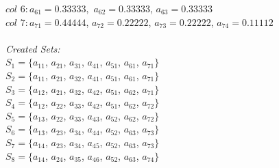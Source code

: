 \documentclass{article}
\begin{document}
$col$ $6 : a_{61} = 0.33333,$ $a_{62} = 0.33333$, $a_{63} = 0.33333$\\
$col$ $7 : a_{71} = 0.44444$, $a_{72} = 0.22222$, $a_{73} = 0.22222$, $a_{74} = 0.11112$\\
\\\textit{Created Sets:}\\
$S_1 = \{a_{11}$, $a_{21}$, $a_{31}$, $a_{41}$, $a_{51}$, $a_{61}$, $a_{71} \}$\\
$S_2 = \{a_{11}$, $a_{21}$, $a_{32}$, $a_{41}$, $a_{51}$, $a_{61}$, $a_{71} \}$\\
$S_3 = \{a_{12}$, $a_{21}$, $a_{32}$, $a_{42}$, $a_{51}$, $a_{62}$, $a_{71} \}$\\
$S_4 = \{a_{12}$, $a_{22}$, $a_{33}$, $a_{42}$, $a_{51}$, $a_{62}$, $a_{72} \}$\\
$S_5 = \{a_{13}$, $a_{22}$, $a_{33}$, $a_{43}$, $a_{52}$, $a_{62}$, $a_{72}\}$\\
$S_6 = \{a_{13}$, $a_{23}$, $a_{34}$, $a_{44}$, $a_{52}$, $a_{63}$, $a_{73}\}$\\
$S_7 = \{a_{14}$, $a_{23}$, $a_{34}$, $a_{45}$, $a_{52}$, $a_{63}$, $a_{73}\}$\\
$S_8 = \{a_{14}$, $a_{24}$, $a_{35}$, $a_{46}$, $a_{52}$, $a_{63}$, $a_{74}\}$\\
\end{document}
